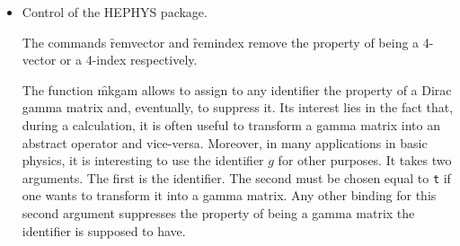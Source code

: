\begin{itemize}
\begin{verbatim}
    list_to_array({1,2,3,4},1,arr}; ==>
\end{verbatim}
generates the array $arr$ with the components 1,2,3,4.
\item[vii.] Control of the \textsc{HEPHYS} package.

\hypertarget{command:REMVECTOR}{}
\hypertarget{command:REMINDEX}{}
The commands \f{remvector} and \f{remindex} remove the property of
being a 4-vector or a 4-index respectively.

\hypertarget{operator:MKGAM}{}
The function \f{mkgam} allows to assign to any identifier the property
of a Dirac gamma matrix and, eventually, to suppress it. Its interest lies
in the fact that, during a calculation, it is often useful to transform
a gamma matrix into an abstract operator and vice-versa. Moreover, in many
applications in basic physics, it is interesting to use the identifier $g$
for other purposes.
It takes two arguments. The first is the identifier. The second must be
chosen equal to \texttt{t} if one wants to transform it into a gamma matrix. Any
other binding for this second argument suppresses the property of being
a gamma matrix the identifier is supposed to have.
\end{itemize}
